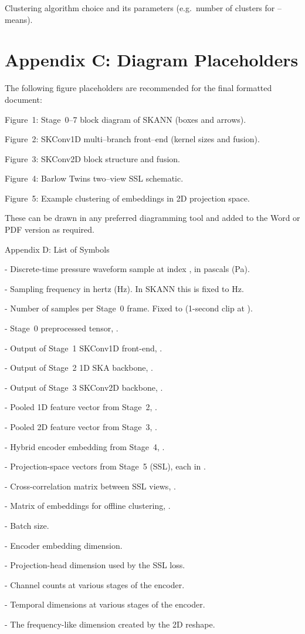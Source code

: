 \documentclass[12pt]{article}
\begin{document}
Clustering algorithm choice and its parameters (e.g. number of clusters for –means).

\section*{Appendix C: Diagram Placeholders}
The following figure placeholders are recommended for the final formatted document:

Figure 1: Stage 0–7 block diagram of SKANN (boxes and arrows).

Figure 2: SKConv1D multi–branch front–end (kernel sizes and fusion).

Figure 3: SKConv2D block structure and fusion.

Figure 4: Barlow Twins two–view SSL schematic.

Figure 5: Example clustering of embeddings in 2D projection space.

These can be drawn in any preferred diagramming tool and added to the Word or PDF version as required.

Appendix D: List of Symbols

- Discrete-time pressure waveform sample at index , in pascals (Pa).

- Sampling frequency in hertz (Hz). In SKANN this is fixed to  Hz.

- Number of samples per Stage 0 frame. Fixed to  (1-second clip at ).

- Stage 0 preprocessed tensor, .

- Output of Stage 1 SKConv1D front-end, .

- Output of Stage 2 1D SKA backbone, .

- Output of Stage 3 SKConv2D backbone, .

- Pooled 1D feature vector from Stage 2, .

- Pooled 2D feature vector from Stage 3, .

- Hybrid encoder embedding from Stage 4, .

- Projection-space vectors from Stage 5 (SSL), each in .

- Cross-correlation matrix between SSL views, .

- Matrix of embeddings for offline clustering, .

- Batch size.

- Encoder embedding dimension.

- Projection-head dimension used by the SSL loss.

- Channel counts at various stages of the encoder.

- Temporal dimensions at various stages of the encoder.

- The frequency-like dimension created by the 2D reshape.
\end{document}
